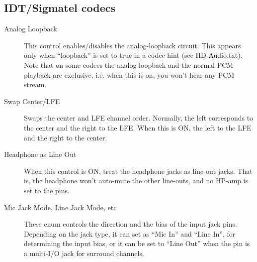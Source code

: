 \documentclass[a4paper,8pt,english]{sphinxmanual}
\begin{document}
\subsection{IDT/Sigmatel codecs}
\label{sound/hd-audio/controls:idt-sigmatel-codecs}\begin{description}
\item[{Analog Loopback}] \leavevmode
This control enables/disables the analog-loopback circuit.  This
appears only when ``loopback'' is set to true in a codec hint
(see HD-Audio.txt).  Note that on some codecs the analog-loopback
and the normal PCM playback are exclusive, i.e. when this is on, you
won't hear any PCM stream.

\item[{Swap Center/LFE}] \leavevmode
Swaps the center and LFE channel order.  Normally, the left
corresponds to the center and the right to the LFE.  When this is
ON, the left to the LFE and the right to the center.

\item[{Headphone as Line Out}] \leavevmode
When this control is ON, treat the headphone jacks as line-out
jacks.  That is, the headphone won't auto-mute the other line-outs,
and no HP-amp is set to the pins.

\item[{Mic Jack Mode, Line Jack Mode, etc}] \leavevmode
These enum controls the direction and the bias of the input jack
pins.  Depending on the jack type, it can set as ``Mic In'' and ``Line
In'', for determining the input bias, or it can be set to ``Line Out''
when the pin is a multi-I/O jack for surround channels.

\end{description}
\end{document}
